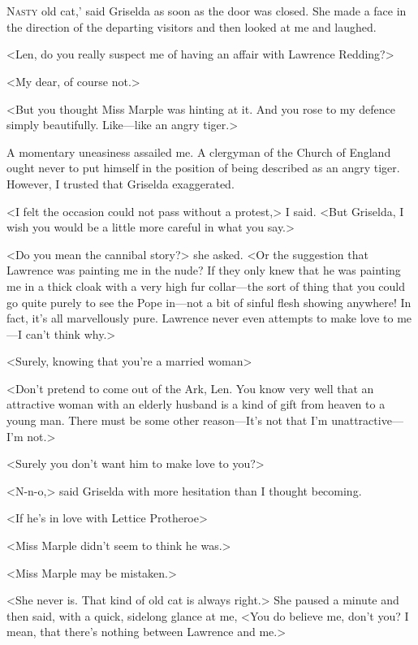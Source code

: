 \chapter[Chapter  \thechapter]{}


\lettrine[ante=`]{N}{asty}  old cat,' said Griselda as soon as the door was closed. She made a face in the direction of the departing visitors and then looked at me and laughed.

\zz
<Len, do you really suspect me of having an affair with Lawrence Redding?>

<My dear, of course not.>

<But you thought Miss Marple was hinting at it. And you rose to my defence simply beautifully. Like—like an angry tiger.>

A momentary uneasiness assailed me. A clergyman of the Church of England ought never to put himself in the position of being described as an angry tiger. However, I trusted that Griselda exaggerated.

<I felt the occasion could not pass without a protest,> I said. <But Griselda, I wish you would be a little more careful in what you say.>

<Do you mean the cannibal story?> she asked. <Or the suggestion that Lawrence was painting me in the nude? If they only knew that he was painting me in a thick cloak with a very high fur collar—the sort of thing that you could go quite purely to see the Pope in—not a bit of sinful flesh showing anywhere! In fact, it's all marvellously pure. Lawrence never even attempts to make love to me—I can't think why.>

<Surely, knowing that you're a married woman\longdash>

<Don't pretend to come out of the Ark, Len. You know very well that an attractive woman with an elderly husband is a kind of gift from heaven to a young man. There must be some other reason—It's not that I'm unattractive—I'm not.>

<Surely you don't want him to make love to you?>

<N-n-o,> said Griselda with more hesitation than I thought becoming.

<If he's in love with Lettice Protheroe\longdash>

<Miss Marple didn't seem to think he was.>

<Miss Marple may be mistaken.>

<She never is. That kind of old cat is always right.> She paused a minute and then said, with a quick, sidelong glance at me, <You do believe me, don't you? I mean, that there's nothing between Lawrence and me.>


